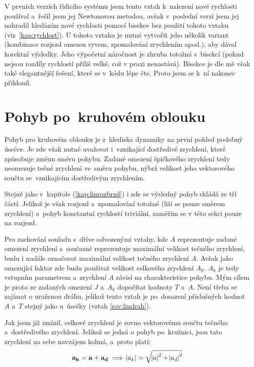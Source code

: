 		V prvních verzích řídicího systému jsem tento vztah k~nalezení nové rychlosti používal a~řešil jsem jej Newtonovou metodou, avšak v~poslední verzi jsem jej nahradil hledáním nové rychlosti pomocí bisekce bez použití tohoto vztahu (viz~\ref{kap:rychlost}). U tohoto vztahu je nutné vytvořit jeho několik variant (kombinace rozjezd omezen ryvem, zpomalování zrychlením apod.), aby dával korektní výsledky. Jeho výpočetní náročnost je zhruba totožná s~bisekcí (pokud nejsou rozdíly rychlostí přiliš velké, což v praxi nenastává). Bisekce je dle mě však také elegantnější řešení, které se v~kódu lépe čte. Proto jsem se k~ní nakonec přiklonil.
	
	\section{Pohyb po~kruhovém oblouku}
	
	Pohyb pro kruhovém oblouku je z~hlediska dynamiky na první pohled podobný úsečce. Je zde však nutné uvažovat i~vznikající dostředivé zrychlení, které způsobuje změnu směru pohybu. Zadané omezení špičkového zrychlení tedy neomezuje tečné zrychlení ve~směru pohybu, nýbrž velikost jeho vektorového součtu se~vznikajícím dostředivým zrychlením.
	
	Stejně jako v~kapitole  (\ref{kap:linrozbrzd}) i zde se výsledný pohyb skládá ze tří částí. Jelikož je však rozjezd a~zpomalování totožné (liší se pouze směrem zrychlení) a~pohyb konstantní rychlostí triviální, zaměřím se v této sekci pouze na rozjezd.
	
	Pro zachování souladu s~dříve odvozenými vztahy, kde $A$ reprezentuje zadané omezení zrychlení a~současně reprezentuje maximální velikost tečného zrychlení, budu i nadále označovat maximální velikost tečného zrychlení $A$. Avšak jako omezující faktor zde budu používat velikost celkového zrychlení $A_k$. $A_k$ je tedy vstupním parametrem a~zrychlení $A$ závisí na charakteristice pohybu.  Mým cílem je proto ze zadaných omezení $J$ a~$A_k$ dopočítat hodnoty $T$ a~$A$. Není třeba se zajímat o uraženou dráhu, jelikož tento vztah je po~dosazení přislušných hodnot $A$ a~$T$ stejný jako u~úsečky (vztah \ref{rov:lindrah}).
	
	Jak jsem již zmínil, celkové zrychlení je rovno vektorovému součtu tečného a~dostředivého zrychlení. Jelikož se jedná o pohyb po~kružnici, jsou tato zrychlení na sebe navzájem kolmá, a~proto platí:
	\begin{equation}
		\label{rov:vektrzrych}
		\mathbf{a_k} = \mathbf{a}+\mathbf{a_d}\implies \abs{a_k}=\sqrt{ \abs{a}^2+ \abs{a_d}^2}
	\end{equation}
	
